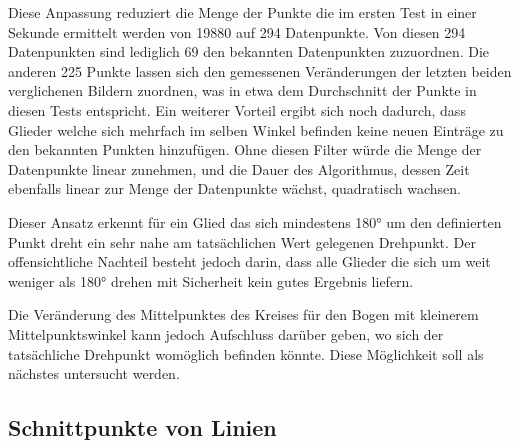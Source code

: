 Diese Anpassung reduziert die Menge der Punkte die im ersten Test in einer Sekunde ermittelt werden von 19880 auf 294 Datenpunkte.
Von diesen 294 Datenpunkten sind lediglich 69 den bekannten Datenpunkten zuzuordnen.
Die anderen 225 Punkte lassen sich den gemessenen Veränderungen der letzten beiden verglichenen Bildern zuordnen, was in etwa dem Durchschnitt der Punkte in diesen Tests entspricht.
Ein weiterer Vorteil ergibt sich noch dadurch, dass Glieder welche sich mehrfach im selben Winkel befinden keine neuen Einträge zu den bekannten Punkten hinzufügen.
Ohne diesen Filter würde die Menge der Datenpunkte linear zunehmen, und die Dauer des Algorithmus, dessen Zeit ebenfalls linear zur Menge der Datenpunkte wächst, quadratisch wachsen.


Dieser Ansatz erkennt für ein Glied das sich mindestens 180° um den definierten Punkt dreht ein sehr nahe am tatsächlichen Wert gelegenen Drehpunkt.
Der offensichtliche Nachteil besteht jedoch darin, dass alle Glieder die sich um weit weniger als 180° drehen mit Sicherheit kein gutes Ergebnis liefern.

Die Veränderung des Mittelpunktes des Kreises für den Bogen mit kleinerem Mittelpunktswinkel kann jedoch Aufschluss darüber geben, wo sich der tatsächliche Drehpunkt womöglich befinden könnte.
Diese Möglichkeit soll als nächstes untersucht werden.


\subsection{Schnittpunkte von Linien}

